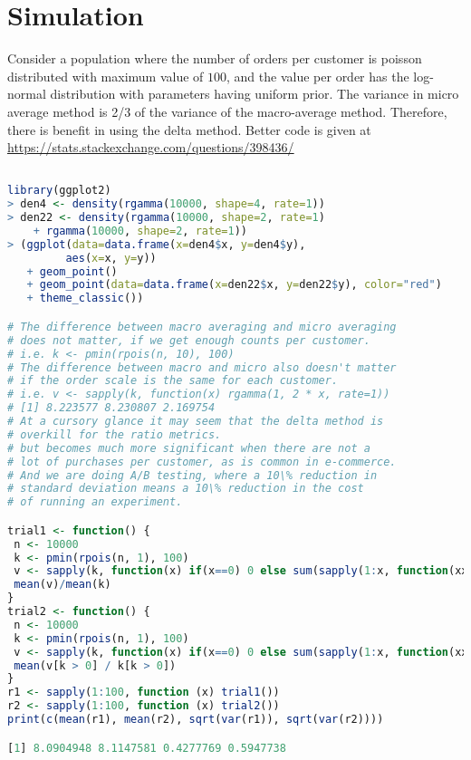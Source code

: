 \documentclass[preview,border={30 30 30 30}]{standalone}
\begin{document}
\section{Simulation}
Consider a population where the number of orders per customer is poisson distributed with maximum value of $100$, and the value per order has the log-normal distribution with parameters having uniform prior.  The variance in micro average method is 2/3 of the variance of the macro-average method. Therefore, there is benefit in using the delta method.
Better code is given at \url{https://stats.stackexchange.com/questions/398436/}
\begin{lstlisting}[language=R]

library(ggplot2)
> den4 <- density(rgamma(10000, shape=4, rate=1))
> den22 <- density(rgamma(10000, shape=2, rate=1) 
    + rgamma(10000, shape=2, rate=1))
> (ggplot(data=data.frame(x=den4$x, y=den4$y), 
         aes(x=x, y=y)) 
   + geom_point() 
   + geom_point(data=data.frame(x=den22$x, y=den22$y), color="red")
   + theme_classic())

# The difference between macro averaging and micro averaging
# does not matter, if we get enough counts per customer.
# i.e. k <- pmin(rpois(n, 10), 100)
# The difference between macro and micro also doesn't matter 
# if the order scale is the same for each customer.
# i.e. v <- sapply(k, function(x) rgamma(1, 2 * x, rate=1))
# [1] 8.223577 8.230807 2.169754
# At a cursory glance it may seem that the delta method is
# overkill for the ratio metrics.
# but becomes much more significant when there are not a 
# lot of purchases per customer, as is common in e-commerce.
# And we are doing A/B testing, where a 10\% reduction in 
# standard deviation means a 10\% reduction in the cost 
# of running an experiment.

trial1 <- function() { 
 n <- 10000
 k <- pmin(rpois(n, 1), 100)
 v <- sapply(k, function(x) if(x==0) 0 else sum(sapply(1:x, function(xx) rlnorm(1, meanlog=runif(1, min=0.1, max=2), sdlog=runif(1, min=0.1, max=2)))))
 mean(v)/mean(k)
}
trial2 <- function() { 
 n <- 10000
 k <- pmin(rpois(n, 1), 100)
 v <- sapply(k, function(x) if(x==0) 0 else sum(sapply(1:x, function(xx) rlnorm(1, meanlog=runif(1, min=0.1, max=2), sdlog=runif(1, min=0.1, max=2)))))
 mean(v[k > 0] / k[k > 0])
}
r1 <- sapply(1:100, function (x) trial1())
r2 <- sapply(1:100, function (x) trial2())
print(c(mean(r1), mean(r2), sqrt(var(r1)), sqrt(var(r2))))

[1] 8.0904948 8.1147581 0.4277769 0.5947738
\end{lstlisting}
\end{document}
